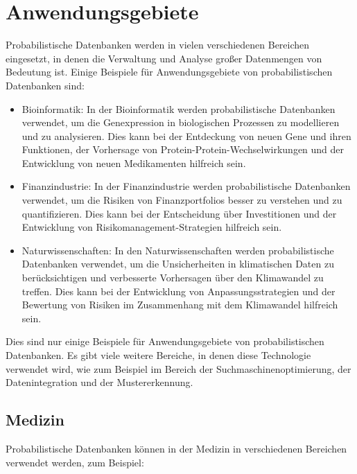 \chapter{Anwendungsgebiete}

Probabilistische Datenbanken werden in vielen verschiedenen Bereichen eingesetzt, in denen die Verwaltung und Analyse großer Datenmengen von Bedeutung ist. Einige Beispiele für Anwendungsgebiete von probabilistischen Datenbanken sind:

\begin{itemize}
	\item Bioinformatik: In der Bioinformatik werden probabilistische Datenbanken verwendet, um die Genexpression in biologischen Prozessen zu modellieren und zu analysieren. Dies kann bei der Entdeckung von neuen Gene und ihren Funktionen, der Vorhersage von Protein-Protein-Wechselwirkungen und der Entwicklung von neuen Medikamenten hilfreich sein.
	
	\item  Finanzindustrie: In der Finanzindustrie werden probabilistische Datenbanken verwendet, um die Risiken von Finanzportfolios besser zu verstehen und zu quantifizieren. Dies kann bei der Entscheidung über Investitionen und der Entwicklung von Risikomanagement-Strategien hilfreich sein.
	
	\item Naturwissenschaften: In den Naturwissenschaften werden probabilistische Datenbanken verwendet, um die Unsicherheiten in klimatischen Daten zu berücksichtigen und verbesserte Vorhersagen über den Klimawandel zu treffen. Dies kann bei der Entwicklung von Anpassungsstrategien und der Bewertung von Risiken im Zusammenhang mit dem Klimawandel hilfreich sein.
\end{itemize}

Dies sind nur einige Beispiele für Anwendungsgebiete von probabilistischen Datenbanken. Es gibt viele weitere Bereiche, in denen diese Technologie verwendet wird, wie zum Beispiel im Bereich der Suchmaschinenoptimierung, der Datenintegration und der Mustererkennung.

\section{Medizin}
Probabilistische Datenbanken können in der Medizin in verschiedenen Bereichen verwendet werden, zum Beispiel:

